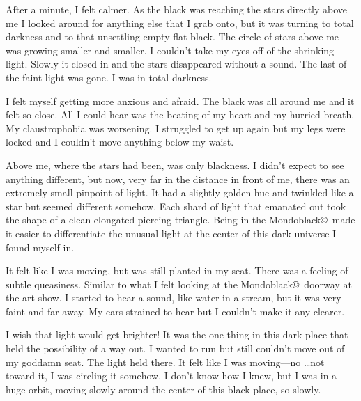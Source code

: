 After a minute, I felt calmer. As the black was reaching the
stars directly above me I looked around for anything else that I
grab onto, but it was turning to total darkness and to that
unsettling empty flat black. The circle of stars above me was
growing smaller and smaller. I couldn't take my eyes off of the
shrinking light. Slowly it closed in and the stars disappeared
without a sound. The last of the faint light was gone. I was in
total darkness.

I felt myself getting more anxious and afraid. The black was all
around me and it felt so close. All I could hear was the beating
of my heart and my hurried breath.  My claustrophobia was worsening.
I struggled to get up again but my legs were locked and I
couldn't move anything below my waist.

Above me, where the stars had been, was only blackness. I didn't
expect to see anything different, but now, very far in the
distance in front of me, there was an extremely small pinpoint
of light. It had a slightly golden hue and twinkled like a star
but seemed different somehow. Each shard of light that emanated
out took the shape of a clean elongated piercing triangle. Being
in the Mondoblack\copyright\ made it easier to differentiate the
unusual light at the center of this dark universe I found myself
in.

It felt like I was moving, but was still planted in my seat.
There was a feeling of subtle queasiness.  Similar to what I felt
looking at the Mondoblack\copyright\ doorway at the art show.
I started to hear a sound, like water in a stream, but
it was very faint and far away. My ears strained to hear but I
couldn't make it any clearer.

I wish that light would get brighter! It was the one thing in
this dark place that held the possibility of a way out. I wanted
to run but still couldn't move out of my goddamn seat. The
light held there. It felt like I was moving---no \ldots not
toward it, I was circling it somehow. I don't know how I knew,
but I was in a huge orbit, moving slowly around the center of
this black place, so slowly.

